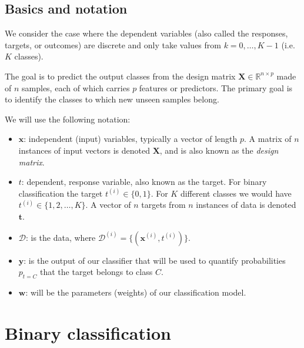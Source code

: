 \documentclass[%
oneside,                 %
final,                   %
10pt]{article}
\newenvironment{notice_mdfboxadmon}[1][]{
\begin{notice_mdfboxmdframed}[frametitle=#1]
}
{
\end{notice_mdfboxmdframed}
}
\begin{document}
\subsection{Basics and notation}

We consider the case where the dependent variables (also called the
responses, targets, or outcomes) are discrete and only take values
from $k=0,\dots,K-1$ (i.e.~$K$ classes).

The goal is to predict the
output classes from the design matrix $\boldsymbol{X}\in\mathbb{R}^{n\times p}$
made of $n$ samples, each of which carries $p$ features or predictors. The
primary goal is to identify the classes to which new unseen samples
belong.


\begin{notice_mdfboxadmon}[Notice]
We will use the following notation:
\begin{itemize}
\item $\boldsymbol{x}$: independent (input) variables, typically a vector of length $p$. A matrix of $n$ instances of input vectors is denoted $\boldsymbol{X}$, and is also known as the \emph{design matrix}.

\item $t$: dependent, response variable, also known as the target. For binary classification the target $t^{(i)} \in \{0,1\}$. For $K$ different classes we would have $t^{(i)} \in \{1, 2, \ldots, K\}$. A vector of $n$ targets from $n$ instances of data is denoted $\boldsymbol{t}$.

\item $\mathcal{D}$: is the data, where $\mathcal{D}^{(i)} = \{ (\boldsymbol{x}^{(i)}, t^{(i)} ) \}$.

\item $\boldsymbol{y}$: is the output of our classifier that will be used to quantify probabilities $p_{t=C}$ that the target belongs to class $C$.

\item $\boldsymbol{w}$: will be the parameters (weights) of our classification model.
\end{itemize}

\noindent
\end{notice_mdfboxadmon} %



\section{Binary classification}
\end{document}
